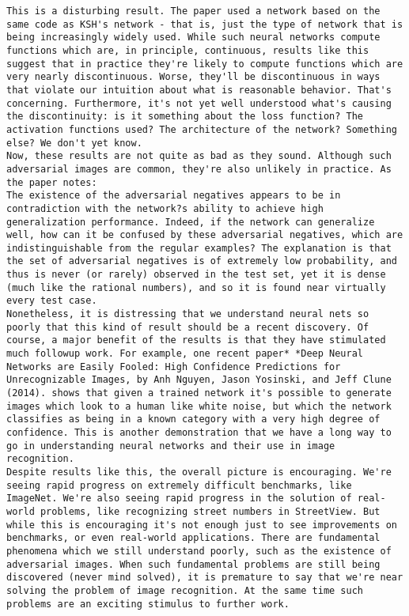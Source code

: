 \begin{lstlisting}
This is a disturbing result. The paper used a network based on the same code as KSH's network - that is, just the type of network that is being increasingly widely used. While such neural networks compute functions which are, in principle, continuous, results like this suggest that in practice they're likely to compute functions which are very nearly discontinuous. Worse, they'll be discontinuous in ways that violate our intuition about what is reasonable behavior. That's concerning. Furthermore, it's not yet well understood what's causing the discontinuity: is it something about the loss function? The activation functions used? The architecture of the network? Something else? We don't yet know.
Now, these results are not quite as bad as they sound. Although such adversarial images are common, they're also unlikely in practice. As the paper notes:
The existence of the adversarial negatives appears to be in contradiction with the network?s ability to achieve high generalization performance. Indeed, if the network can generalize well, how can it be confused by these adversarial negatives, which are indistinguishable from the regular examples? The explanation is that the set of adversarial negatives is of extremely low probability, and thus is never (or rarely) observed in the test set, yet it is dense (much like the rational numbers), and so it is found near virtually every test case. 
Nonetheless, it is distressing that we understand neural nets so poorly that this kind of result should be a recent discovery. Of course, a major benefit of the results is that they have stimulated much followup work. For example, one recent paper* *Deep Neural Networks are Easily Fooled: High Confidence Predictions for Unrecognizable Images, by Anh Nguyen, Jason Yosinski, and Jeff Clune (2014). shows that given a trained network it's possible to generate images which look to a human like white noise, but which the network classifies as being in a known category with a very high degree of confidence. This is another demonstration that we have a long way to go in understanding neural networks and their use in image recognition.
Despite results like this, the overall picture is encouraging. We're seeing rapid progress on extremely difficult benchmarks, like ImageNet. We're also seeing rapid progress in the solution of real-world problems, like recognizing street numbers in StreetView. But while this is encouraging it's not enough just to see improvements on benchmarks, or even real-world applications. There are fundamental phenomena which we still understand poorly, such as the existence of adversarial images. When such fundamental problems are still being discovered (never mind solved), it is premature to say that we're near solving the problem of image recognition. At the same time such problems are an exciting stimulus to further work.

\end{lstlisting}
